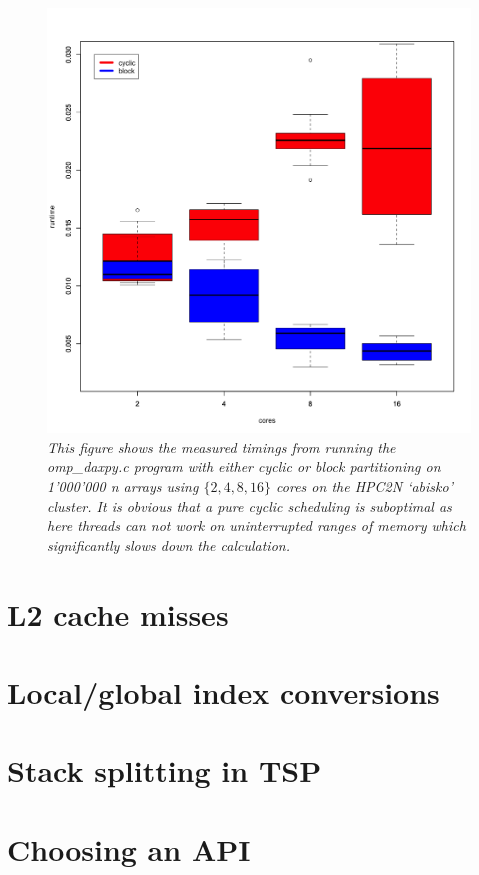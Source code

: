 \documentclass[a4paper,11pt,twoside]{article}
\begin{document}
\begin{figure}
  \centering
  \includegraphics[width=1\textwidth]{daxpy.png}
  \caption{\textit{This figure shows the measured timings from running the omp\_daxpy.c program with either cyclic or block partitioning on 1'000'000 n arrays using $\{2, 4, 8, 16\}$ cores on the HPC2N `abisko' cluster. It is obvious that a pure cyclic scheduling is suboptimal as here threads can not work on uninterrupted ranges of memory which significantly slows down the calculation.}}
  \label{fig:daxpy}
\end{figure}

\section{L2 cache misses}

\section{Local/global index conversions}

\section{Stack splitting in TSP}

\section{Choosing an API}




\end{document}
